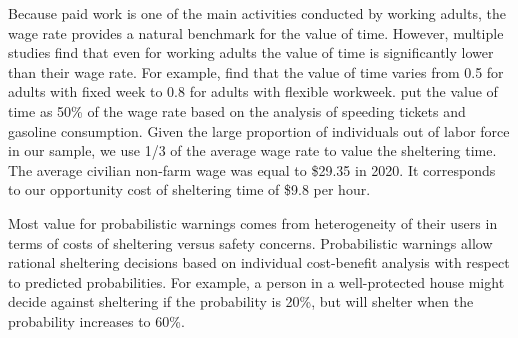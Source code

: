\documentclass{ametsocV6.1}
\begin{document}
Because paid work is one of the main activities conducted by working adults, the wage rate provides a natural benchmark for the value of time. However, multiple studies find that even for working adults the value of time is significantly lower than their wage rate. For example, \citet{larson_revealing_2004} find that the value of time varies from 0.5 for adults with fixed week to 0.8 for adults with flexible workweek. \citet{wolff_value_2014} put the value of time as 50\% of the wage rate based on the analysis of speeding tickets and gasoline consumption. Given the large proportion of individuals out of labor force in our sample, we use 1/3 of the average wage rate to value the sheltering time. The average civilian non-farm wage was equal to \$29.35 in 2020. It corresponds to our opportunity cost of sheltering time of \$9.8 per hour.

Most value for probabilistic warnings comes from heterogeneity of their users in terms of costs of sheltering versus safety concerns. Probabilistic warnings allow rational sheltering decisions based on individual cost-benefit analysis with respect to predicted probabilities. For example, a person in a well-protected house might decide against sheltering if the probability is 20\%, but will shelter when the probability increases to 60\%. 
\end{document}
